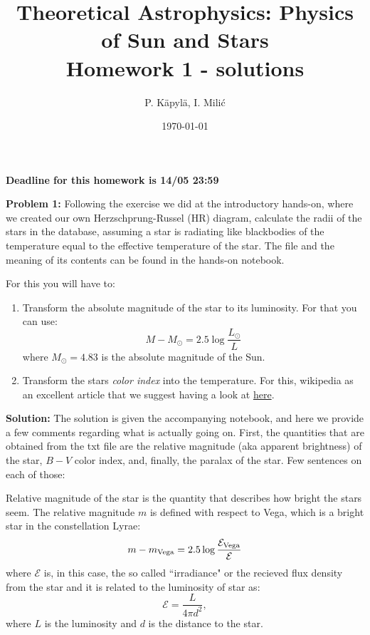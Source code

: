 \documentclass[12pt]{article}
\title{Theoretical Astrophysics: Physics of Sun and Stars\\
Homework 1 - solutions}
\author{P. K\"{a}pyl\"{a}, I. Mili\'{c}}
\date{\today}
\begin{document}
\maketitle

\textbf{Deadline for this homework is 14/05 23:59}



{\bf Problem 1:} Following the exercise we did at the introductory hands-on, where we created our own Herzschprung-Russel (HR) diagram, calculate the radii of the stars in the database, assuming a star is radiating like blackbodies of the temperature equal to the effective temperature of the star. The file and the meaning of its contents can be found in the hands-on notebook.

For this you will have to: 
\begin{enumerate}
  \item Transform the absolute magnitude of the star to its luminosity. For that you can use: 
\begin{equation}
  M - M_{\odot} = 2.5\log \frac{L_{\odot}}{L}
\end{equation}
  where $M_{\odot} = 4.83$ is the absolute magnitude of the Sun. 

  \item Transform the stars \emph{color index} into the temperature. For this, wikipedia as an excellent article that we suggest having a look at \href{https://en.wikipedia.org/wiki/Color_index}{here}.

\end{enumerate}

\textbf{Solution:} The solution is given the accompanying notebook,
and here we provide a few comments regarding what is actually going
on. First, the quantities that are obtained from the txt file are the
relative magnitude (aka apparent brightness) of the star, $B-V$ color
index, and, finally, the paralax of the star. Few sentences on each of
those:

Relative magnitude of the star is the quantity that describes how
bright the stars seem. The relative magnitude $m$ is defined with
respect to Vega, which is a bright star in the constellation Lyrae:
\begin{equation}
m - m_{\rm Vega} = 2.5 \log \frac{\mathcal{E}_{\rm Vega}}{\mathcal{E}}
\end{equation}
where $\mathcal{E}$ is, in this case, the so called ``irradiance" or
the recieved flux density from the star and it is related to the
luminosity of star as:
\begin{equation}
\mathcal{E} = \frac{L}{4\pi d^2},
\end{equation}
where $L$ is the luminosity and $d$ is the distance to the star.
\end{document}
